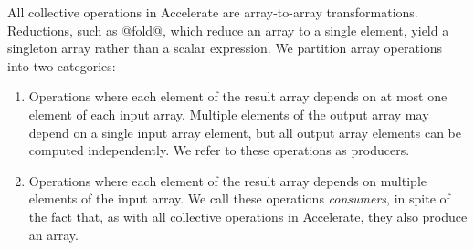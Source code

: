 All collective operations in Accelerate are array-to-array transformations.
Reductions, such as @fold@, which reduce an array to a single element,
yield a singleton array rather than a scalar expression. We partition array
operations into two categories:

\begin{enumerate}
    \item Operations where each element of the result array depends on at most
        one element of each input array. Multiple elements of the output array
        may depend on a single input array element, but all output array
        elements can be computed independently. We refer to these operations as
        producers.

    \item Operations where each element of the result array depends on multiple
        elements of the input array. We call these operations
        \emph{consumers}, in spite of the fact that, as with all
        collective operations in Accelerate, they also produce an array.
\end{enumerate}

